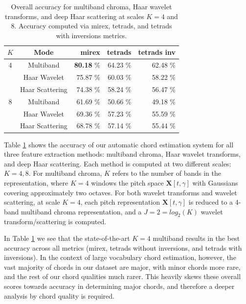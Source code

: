 \documentclass{article}
\begin{document}
\begin{table}
	\begin{center}
	\begin{tabular} {| c | c | r | r | r |}
	\hline
	$K$ & Mode & mirex & tetrads & tetrads inv \\
	\hline
	4 & Multiband & \textbf{80.18} \% & 64.23 \% & 62.48 \% \\
	& Haar Wavelet & 75.87 \% & 60.03 \% & 58.22 \%\\
	& Haar Scattering & 74.38 \% & 58.24 \% & 56.47 \% \\
	\hline
	8 & Multiband & 61.69 \% & 50.66 \% & 49.18 \% \\
	& Haar Wavelet & 69.36 \% & 57.23 \% & 55.59 \% \\
	& Haar Scattering & 68.78 \% & 57.14 \% & 55.44 \% \\
	\hline
	\end{tabular}
	\end{center}
	\protect\caption{Overall accuracy for multiband chroma, Haar wavelet transforms, and deep Haar scattering at scales $K=4$ and $8$. Accuracy computed via mirex, tetrads, and tetrads with inversions 	metrics.
	\label{table:overall-scores}}
\end{table}

Table \ref{table:overall-scores} shows the accuracy of our automatic chord estimation system for all three feature extraction methods: multiband chroma, Haar wavelet transforms, and deep Haar scattering. Each method is computed at two different scales: $K=4,8$. For multiband chroma, $K$ refers to the number of bands in the representation, where $K=4$ windows the pitch space $\mathbf{X}[t, \gamma]$ with Gaussians covering approximately two octaves. For both wavelet transforms and wavelet scattering, at scale $K=4$, each pitch representation $\mathbf{X}[t,\gamma]$ is reduced to a 4-band multiband chroma representation, and a $J=2=log_2(K)$ wavelet transform/scattering is computed. 

In Table \ref{table:overall-scores} we see that the state-of-the-art $K=4$ multiband results in the best accuracy across all metrics (mirex, tetrads without inversions, and tetrads with inversions). In the context of large vocabulary chord estimation, however, the vast majority of chords in our dataset are major, with minor chords more rare, and the rest of our chord qualities much rarer. This heavily skews these overall scores towards accuracy in determining major chords, and therefore a deeper analysis by chord quality is required.
\end{document}
